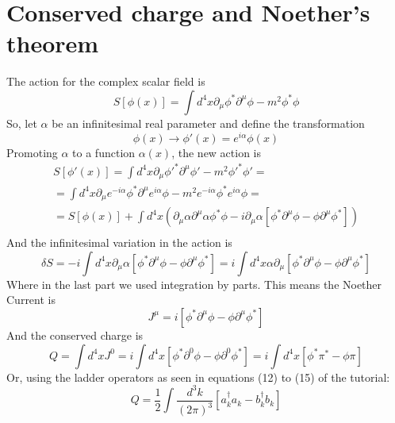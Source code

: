 \documentclass{article}
\begin{document}
\section{Conserved charge and Noether’s theorem}
The action for the complex scalar field is
\begin{equation}
    S\left[\phi(x)\right] = \int d^4x \partial_\mu\phi^*\partial^\mu\phi - m^2\phi^*\phi
\end{equation}
So, let $\alpha$ be an infinitesimal real parameter and define the transformation
\begin{equation}
    \phi(x) \rightarrow \phi'(x) = e^{i\alpha}\phi(x)
\end{equation}
Promoting $\alpha$ to a function $\alpha(x)$, the new action is
\begin{equation}
\begin{gathered}
    S\left[\phi'(x)\right] = \int d^4x \partial_\mu\phi'^*\partial^\mu\phi' - m^2\phi'^*\phi' = 
    \\
    = \int d^4x \partial_\mu e^{-i\alpha}\phi^*\partial^\mu e^{i\alpha}\phi - m^2e^{-i\alpha}\phi^*e^{i\alpha}\phi =
    \\
    = S\left[\phi(x)\right] + \int d^4x\left(\partial_\mu \alpha \partial^\mu \alpha \phi^* \phi - i\partial_\mu\alpha\left[\phi^*\partial^\mu\phi - \phi\partial^\mu\phi^*\right]\right)
    \\
\end{gathered}
\end{equation}
And the infinitesimal variation in the action is
\begin{equation}
    \delta S = - i \int d^4x \partial_\mu\alpha\left[\phi^*\partial^\mu\phi - \phi\partial^\mu\phi^*\right] = i \int d^4x \alpha \partial_\mu \left[\phi^*\partial^\mu\phi - \phi\partial^\mu\phi^*\right]
\end{equation}
Where in the last part we used integration by parts. This means the Noether Current is
\begin{equation}
    J^\mu = i\left[\phi^*\partial^\mu\phi - \phi\partial^\mu\phi^*\right]
\end{equation}
And the conserved charge is
\begin{equation}
    Q = \int d^4x J^0 = i \int d^4x \left[\phi^*\partial^0\phi - \phi\partial^0\phi^*\right]
    = i \int d^4x \left[\phi^*\pi^* - \phi\pi\right]
\end{equation}
Or, using the ladder operators as seen in equations (12) to (15) of the tutorial:
\begin{equation}
    Q = \frac{1}{2}\int \frac{d^3k}{(2\pi)^3} \left[a^\dagger_k a_k - b^\dagger_k b_k\right]
\end{equation}
\end{document}
